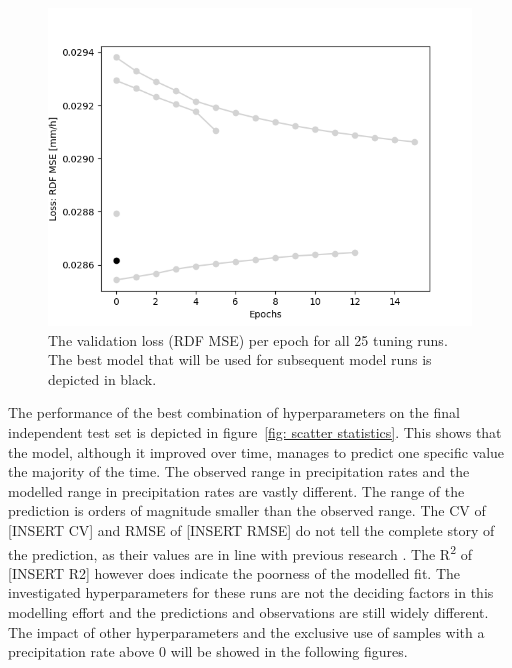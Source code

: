 \documentclass[twocolumn, 10pt, a4paper]{memoir}
\begin{document}
	\begin{figure}[h]
		\includegraphics[width=\columnwidth]{ex_loss_epochs}
		\caption{The validation loss (RDF MSE) per epoch for all 25 tuning runs. The best model that will be used for subsequent model runs is depicted in black.}
		\label{fig: loss epochs}
	\end{figure}

	The performance of the best combination of hyperparameters on the final independent test set is depicted in figure~\ref{fig: scatter statistics}. This shows that the model, although it improved over time, manages to predict one specific value the majority of the time. The observed range in precipitation rates and the modelled range in precipitation rates are vastly different. The range of the prediction is orders of magnitude smaller than the observed range. The CV of [INSERT CV] and RMSE of [INSERT RMSE] do not tell the complete story of the prediction, as their values are in line with previous research \cite{Pudashine2020}. The R\textsuperscript{2} of [INSERT R2] however does indicate the poorness of the modelled fit. The investigated hyperparameters for these runs are not the deciding factors in this modelling effort and the predictions and observations are still widely different. The impact of other hyperparameters and the exclusive use of samples with a precipitation rate above 0 will be showed in the following figures. 
	
\end{document}
